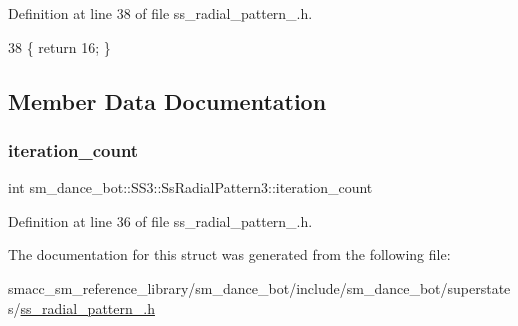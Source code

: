 Definition at line 38 of file ss\+\_\+radial\+\_\+pattern\+\_.\+h.


\begin{DoxyCode}
38 \{ \textcolor{keywordflow}{return} 16; \}
\end{DoxyCode}


\subsection{Member Data Documentation}
\mbox{\label{structsm__dance__bot_1_1SS3_1_1SsRadialPattern3_a62885be83defcafb3fe5237dd3ec6b4c}} 
\subsubsection{\texorpdfstring{iteration\+\_\+count}{iteration\_count}}
{\footnotesize\ttfamily int sm\+\_\+dance\+\_\+bot\+::\+S\+S3\+::\+Ss\+Radial\+Pattern3\+::iteration\+\_\+count}



Definition at line 36 of file ss\+\_\+radial\+\_\+pattern\+\_.\+h.



The documentation for this struct was generated from the following file\+:\begin{DoxyCompactItemize}
\item 
smacc\+\_\+sm\+\_\+reference\+\_\+library/sm\+\_\+dance\+\_\+bot/include/sm\+\_\+dance\+\_\+bot/superstates/\hyperlink{include_2sm__dance__bot_2superstates_2ss__radial__pattern__3_8h}{ss\+\_\+radial\+\_\+pattern\+\_.\+h}\end{DoxyCompactItemize}
